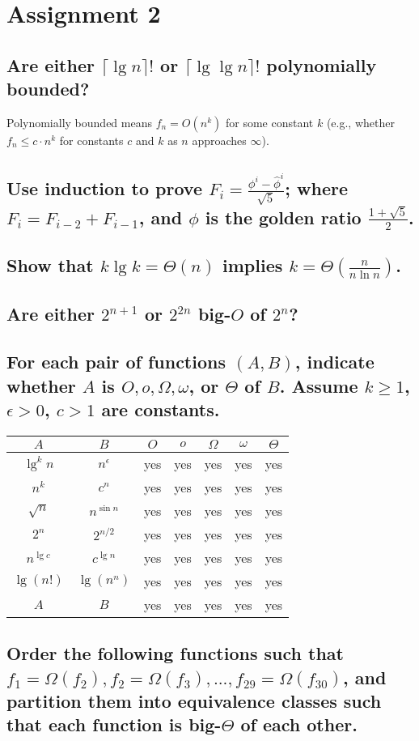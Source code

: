 \chapter{Assignment 2}

\section[Problem 1]{Are either $\lceil \lg n \rceil!$ or $\lceil \lg \lg n \rceil!$ polynomially bounded?}
Polynomially bounded means $f_n = O(n^k)$ for some constant $k$ (e.g., whether $f_n \leq c \cdot n^k$ for constants $c$ and $k$ as $n$ approaches $\infty$). 

\section[Problem 2]{Use induction to prove $F_i = \frac{\phi^i - \hat{\phi}^i}{\sqrt{5}}$; where $F_i = F_{i-2} + F_{i-1}$, and $\phi$ is the golden ratio $\frac{1 + \sqrt{5}}{2}$.}

\section[Problem 3]{Show that $k \lg k = \Theta(n)$ implies $k = \Theta\left(\frac{n}{n \ln n}\right)$.}

\section[Problem 4]{Are either $2^{n + 1}$ or $2^{2n}$ big-$O$ of $2^n$?}

\section[Problem 5]{For each pair of functions $(A, B)$, indicate whether $A$ is $O, o, \Omega, \omega$, or $\Theta$ of $B$. Assume $k \geq 1$, $\epsilon > 0$, $c > 1$ are constants.}

\begin{center}
	\begin{tabular}{cc|c|c|c|c|c}
		$A$ & $B$ & $O$ & $o$ & $\Omega$ & $\omega$ & $\Theta$ \\ \hline
		$\lg^k n$ & $n^{\epsilon}$ & yes & yes & yes & yes & yes \\ \hline
		$n^k$ & $c^n$ & yes & yes & yes & yes & yes \\ \hline
		$\sqrt{n}$ & $n^{\sin n}$ & yes & yes & yes & yes & yes \\ \hline
		$2^n$ & $2^{n/2}$ & yes & yes & yes & yes & yes \\ \hline
		$n^{\lg c}$ & $c^{\lg n}$ & yes & yes & yes & yes & yes \\ \hline
		$\lg(n!)$ & $\lg(n^n)$ & yes & yes & yes & yes & yes \\ \hline
		$A$ & $B$ & yes & yes & yes & yes & yes
	\end{tabular}
\end{center}

\section[Problem 6]{Order the following functions such that $f_1 = \Omega(f_2), f_2 = \Omega(f_3), ..., f_{29} = \Omega(f_{30})$, and partition them into equivalence classes such that each function is big-$\Theta$ of each other.}

